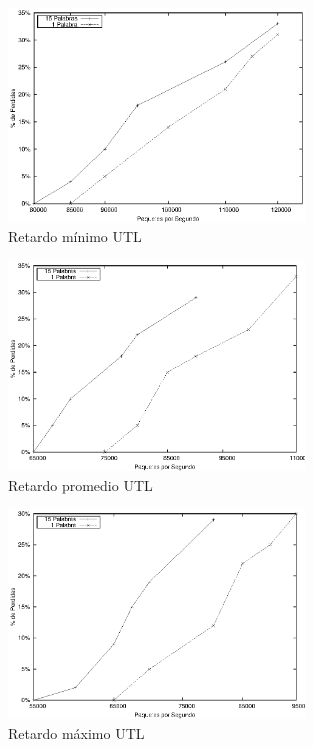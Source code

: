 \begin{figure}[!h]
  \centering
	\includegraphics[width=0.7\textwidth]{5-resultados/graf/utlmin.eps}
  \caption{Retardo mínimo UTL}
  \label{fig}
\end{figure}
\begin{figure}[!h]
  \centering
	\includegraphics[width=0.7\textwidth]{5-resultados/graf/utlprom.eps}
  \caption{Retardo promedio UTL}
  \label{fig}
\end{figure}
\begin{figure}[!h]
  \centering
	\includegraphics[width=0.7\textwidth]{5-resultados/graf/utlmax.eps}
  \caption{Retardo máximo UTL}
  \label{fig}
\end{figure}

